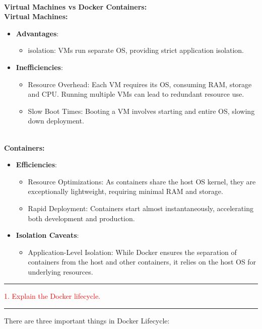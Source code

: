 \documentclass{article}
\begin{document}
\\
\textbf{Virtual Machines vs Docker Containers:} \\
\textbf{Virtual Machines:}
\begin{itemize}
\color{blue}
\item \textbf{Advantages}: 
\begin{itemize}
    \item isolation: VMs run separate OS, providing strict application isolation.
\end{itemize}
\item \textbf{Inefficiencies}: 
\begin{itemize}
    \item Resource Overhead: Each VM requires its OS, consuming RAM, storage and CPU. Running multiple VMs can lead to redundant resource use.
    \item Slow Boot Times: Booting a VM involves starting and entire OS, slowing down deployment.
\end{itemize}
\end{itemize}
\\
\textbf{Containers:}
\begin{itemize}
\color{blue}
\item \textbf{Efficiencies}: 
\begin{itemize}
    \item Resource Optimizations: As containers share the host OS kernel, they are exceptionally lightweight, requiring minimal RAM and storage.
    \item Rapid Deployment: Containers start almost instantaneously, accelerating both development and production.
\end{itemize}
\item \textbf{Isolation Caveats}: 
\begin{itemize}
    \item Application-Level Isolation: While Docker ensures the separation of containers from the host and other containers, it relies on the host OS for underlying resources.
\end{itemize}
\end{itemize}
\newpage
\noindent
{\color{red} \rule{\linewidth}{0.5mm}}
\textcolor{red}{1. Explain the Docker lifecycle.} \\
\noindent
{\color{red} \rule{\linewidth}{0.5mm}}
There are three important things in Docker Lifecycle:
\end{document}
